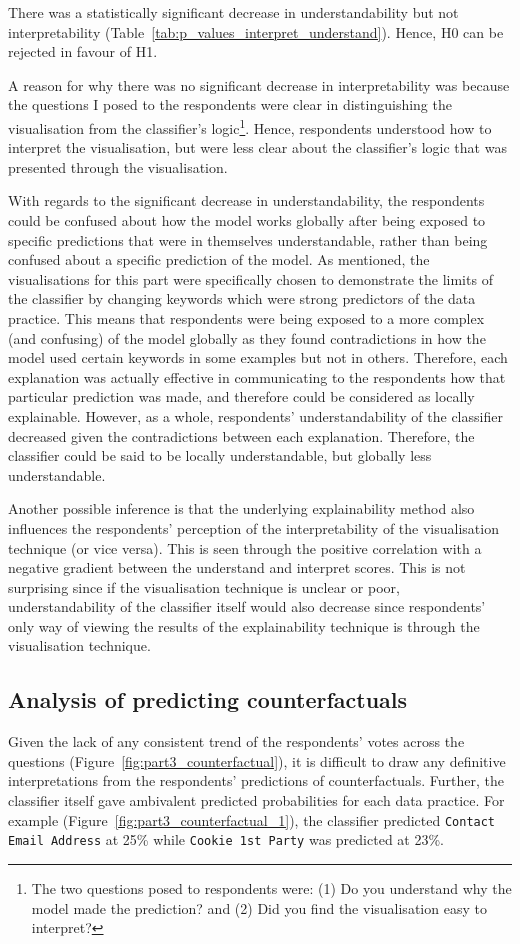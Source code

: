 There was a statistically significant decrease in understandability but not interpretability (Table~\ref{tab:p_values_interpret_understand}). Hence, H0 can be rejected in favour of H1. 

A reason for why there was no significant decrease in interpretability was because the questions I posed to the respondents were clear in distinguishing the visualisation from the classifier's logic\footnote{The two questions posed to respondents were: (1) Do you understand why the model made the prediction? and (2) Did you find the visualisation easy to interpret?}. Hence, respondents understood how to interpret the visualisation, but were less clear about the classifier's logic that was presented through the visualisation. 

With regards to the significant decrease in understandability, the respondents could be confused about how the model works globally after being exposed to specific predictions that were in themselves understandable, rather than being confused about a specific prediction of the model. As mentioned, the visualisations for this part were specifically chosen to demonstrate the limits of the classifier by changing keywords which were strong predictors of the data practice. This means that respondents were being exposed to a more complex (and confusing) of the model globally as they found contradictions in how the model used certain keywords in some examples but not in others. Therefore, each explanation was actually effective in communicating to the respondents how that particular prediction was made, and therefore could be considered as locally explainable. However, as a whole, respondents' understandability of the classifier decreased given the contradictions between each explanation. Therefore, the classifier could be said to be locally understandable, but globally less understandable.

Another possible inference is that the underlying explainability method also influences the respondents' perception of the interpretability of the visualisation technique (or vice versa). This is seen through the positive correlation with a negative gradient between the understand and interpret scores. This is not surprising since if the visualisation technique is unclear or poor, understandability of the classifier itself would also decrease since respondents' only way of viewing the results of the explainability technique is through the visualisation technique.

\subsection{Analysis of predicting counterfactuals}
Given the lack of any consistent trend of the respondents' votes across the questions (Figure~\ref{fig:part3_counterfactual}), it is difficult to draw any definitive interpretations from the respondents' predictions of counterfactuals. Further, the classifier itself gave ambivalent predicted probabilities for each data practice. For example (Figure~\ref{fig:part3_counterfactual_1}), the classifier predicted \texttt{Contact Email Address} at 25\% while \texttt{Cookie 1st Party} was predicted at 23\%.

